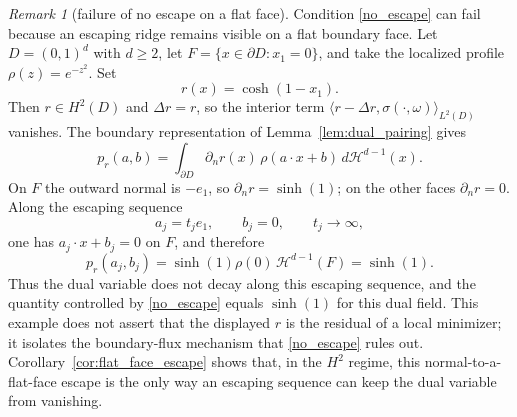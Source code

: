\documentclass[11pt]{amsart}
\theoremstyle{definition}
\theoremstyle{remark}
\newtheorem{remark}[theorem]{Remark}
\begin{document}
\begin{remark}[failure of no escape on a flat face]\label{rem:flat_face_counterexample}
Condition \eqref{no_escape} can fail because an escaping ridge remains visible
on a flat boundary face. Let $D=(0,1)^d$ with $d\ge2$, let
$F=\{x\in\partial D:x_1=0\}$, and take the localized profile
$\rho(z)=e^{-z^2}$. Set
\begin{equation*}
	r(x)=\cosh(1-x_1).
\end{equation*}
Then $r\in H^2(D)$ and $\Delta r=r$, so the interior term
$\langle r-\Delta r,\sigma(\cdot,\omega)\rangle_{L^2(D)}$ vanishes. The
boundary representation of Lemma~\ref{lem:dual_pairing} gives
\begin{equation*}
	p_r(a,b)
	=
	\int_{\partial D}\partial_n r(x)\,\rho(a\cdot x+b)\,
	d\mathcal{H}^{d-1}(x).
\end{equation*}
On $F$ the outward normal is $-e_1$, so $\partial_n r=\sinh(1)$; on the other
faces $\partial_n r=0$. Along the escaping sequence
\begin{equation*}
	a_j=t_j e_1,\qquad b_j=0,\qquad t_j\to\infty,
\end{equation*}
one has $a_j\cdot x+b_j=0$ on $F$, and therefore
\begin{equation*}
	p_r(a_j,b_j)
	=
	\sinh(1)\rho(0)\,\mathcal{H}^{d-1}(F)
	=
	\sinh(1).
\end{equation*}
Thus the dual variable does not decay along this escaping sequence, and the
quantity controlled by \eqref{no_escape} equals $\sinh(1)$ for this dual field.
This example does not assert that the displayed $r$ is the residual of a local
minimizer; it isolates the boundary-flux mechanism that \eqref{no_escape} rules
out. Corollary~\ref{cor:flat_face_escape} shows that, in the $H^2$ regime, this
normal-to-a-flat-face escape is the only way an escaping sequence can keep the
dual variable from vanishing.
\end{remark}
\end{document}
